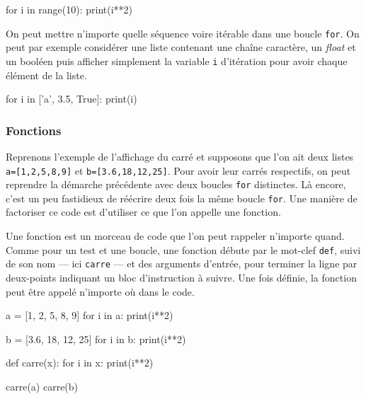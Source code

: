 \begin{idleconsole}
\begin{pyconsole}
for i in range(10):
    print(i**2)

\end{pyconsole}
\end{idleconsole}

On peut mettre n'importe quelle séquence voire itérable dans une boucle \texttt{for}. On peut par exemple considérer une liste contenant une chaîne caractère, un \textit{float} et un booléen puis afficher simplement la variable \texttt{i} d'itération pour avoir chaque élément de la liste.

\begin{idleconsole}
\begin{pyconsole}
for i in ['a', 3.5, True]:
    print(i)

\end{pyconsole}
\end{idleconsole}

\subsubsection[Fonctions]{Fonctions}
\label{subsub:XI.3.2.2}

Reprenons l'exemple de l'affichage du carré et supposons que l'on ait deux listes \texttt{a=[1,2,5,8,9]} et \texttt{b=[3.6,18,12,25]}. Pour avoir leur carrés respectifs, on peut reprendre la démarche précédente avec deux boucles \texttt{for} distinctes. Là encore, c'est un peu fastidieux de réécrire deux fois la même boucle \texttt{for}. Une manière de factoriser ce code est d'utiliser ce que l'on appelle une fonction.


Une fonction est un morceau de code que l'on peut rappeler n'importe quand. Comme pour un test et une boucle, une fonction débute par le mot-clef \texttt{def}, suivi de son nom --- ici \texttt{carre} --- et des arguments d'entrée, pour terminer la ligne par deux-points indiquant un bloc d'instruction à suivre. Une fois définie, la fonction peut être appelé n'importe où dans le code.

\begin{idleconsole}
\begin{pyconsole}
a = [1, 2, 5, 8, 9]
for i in a:
    print(i**2)

b = [3.6, 18, 12, 25]
for i in b:
    print(i**2)

def carre(x):
    for i in x:
        print(i**2)

carre(a)
carre(b)

\end{pyconsole}
\end{idleconsole}

